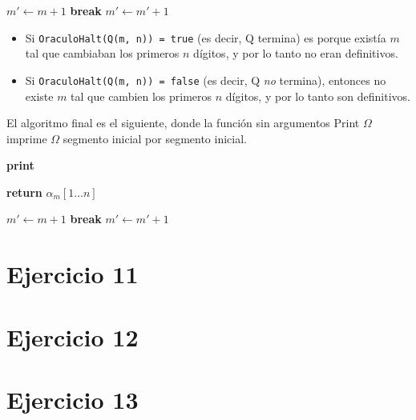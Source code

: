 \documentclass{article}
\theoremstyle{definition} %
\newcommand{\firstn}[1]{#1[1 \dots n]}
\begin{document}
\begin{algorithmic}
        \State $m' \gets m + 1$
            \If{$\firstn{\alpha_m} \neq \firstn{\alpha_m'}$}
            \State \textbf{break}
            \EndIf
            \State $m' \gets m' + 1$
        \EndWhile
    \EndFunction
\end{algorithmic}

\begin{itemize}
    \item Si \texttt{OraculoHalt(Q(m, n)) = true} (es decir, Q termina) es
    porque existía $m$ tal que cambiaban los primeros $n$ dígitos, y por lo
    tanto no eran definitivos.

    \item Si \texttt{OraculoHalt(Q(m, n)) = false} (es decir, Q \textit{no}
    termina), entonces no existe $m$ tal que cambien los primeros $n$ dígitos, y
    por lo tanto son definitivos.
\end{itemize}

El algoritmo final es el siguiente, donde la función sin argumentos Print
$\Omega$ imprime $\Omega$ segmento inicial por segmento inicial.

\begin{algorithmic}

            \State \textbf{print} 
        \EndFor

    \EndFunction


            \State \textbf{return} $\firstn{\alpha_m}$
        \EndIf
    \EndFor

\EndFunction

        \State $m' \gets m + 1$
            \If{$\firstn{\alpha_m} \neq \firstn{\alpha_m'}$}
            \State \textbf{break}
            \EndIf
            \State $m' \gets m' + 1$
        \EndWhile
    \EndFunction
\end{algorithmic}

\newpage

\section*{Ejercicio 11}

\newpage
\section*{Ejercicio 12}

\newpage

\section*{Ejercicio 13}

\newpage
\end{document}
